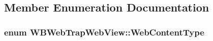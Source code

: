 \subsection{Member Enumeration Documentation}
\hypertarget{class_w_b_web_trap_web_view_a4cb16c98c564cf5258d2d1029531cebe}{
\subsubsection[{Web\-Content\-Type}]{\setlength{\rightskip}{0pt plus 5cm}enum {\bf W\-B\-Web\-Trap\-Web\-View\-::\-Web\-Content\-Type}\hspace{0.3cm}{\ttfamily [protected]}}}\label{db/d78/class_w_b_web_trap_web_view_a4cb16c98c564cf5258d2d1029531cebe}
